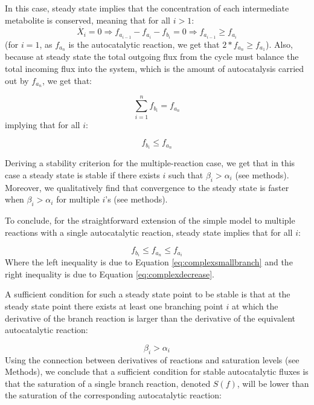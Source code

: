     In this case, steady state implies that the concentration of each intermediate metabolite is conserved, meaning that for all $i>1$:
    \begin{equation}
        \label{eq:complexdecrease}
      \dot{X_i}=0 \Rightarrow f_{a_{i-1}}-f_{a_i}-f_{b_i}=0 \Rightarrow f_{a_{i-1}} \geq f_{a_i}
    \end{equation}
    (for $i=1$, as $f_{a_n}$ is the autocatalytic reaction, we get that $2*f_{a_{n}} \geq f_{a_1}$).
    Also, because at steady state the total outgoing flux from the cycle must balance the total incoming flux into the system, which is the amount of autocatalysis carried out by $f_{a_n}$, we get that:

    \begin{equation*}
      \sum_{i=1}^n f_{b_i}=f_{a_n}
  \end{equation*}
implying that for all $i$:

    \begin{equation}
        \label{eq:complexsmallbranch}
        f_{b_i} \leq f_{a_n}
  \end{equation}

    Deriving a stability criterion for the multiple-reaction case, we get that in this case a steady state is stable if there exists $i$ such that $\beta_i > \alpha_i$ (see methods).
    Moreover, we qualitatively find that convergence to the steady state is faster when $\beta_i > \alpha_i$ for multiple $i$'s (see methods).

    To conclude, for the straightforward extension of the simple model to multiple reactions with a single autocatalytic reaction, steady state implies that for all $i$:

    \begin{equation}
        f_{b_i} \leq f_{a_n} \leq f_{a_i}
      \label{eq:complexstst}
    \end{equation}
    Where the left inequality is due to Equation \ref{eq:complexsmallbranch} and the right inequality is due to Equation \ref{eq:complexdecrease}.

    A sufficient condition for such a steady state point to be stable is that at the steady state point there exists at least one branching point $i$ at which the derivative of the branch reaction is larger than the derivative of the equivalent autocatalytic reaction:

    \begin{equation}
      \beta_i > \alpha_i
      \label{eq:complexstab}
    \end{equation}
    Using the connection between derivatives of reactions and saturation levels (see Methods), we conclude that a sufficient condition for stable autocatalytic fluxes is that the saturation of a single branch reaction, denoted $S(f)$, will be lower than the saturation of the corresponding autocatalytic reaction:

